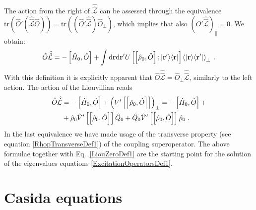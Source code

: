 \documentclass[reprint,aps,prb]{revtex4-1}
\newcommand{\dd}{{\rm d}}
\renewcommand{\r}{{\bf r}}
\newcommand{\be}{\begin{equation}}
\newcommand{\ee}{\end{equation}}
\newcommand{\nn}{\notag}
\newcommand{\lb}{\label}
\newcommand{\op}[1]{\hat {#1}}
\newcommand{\sop}[1]{\op{\op {#1}}}
\newcommand{\commutator}[2]{\left[ {#1} , {#2} \right]}
\newcommand{\trace}[1]{\mathrm{tr}\left(#1\right)}
\newcommand{\ketbra}[2]{| #1 \rangle \langle #2 |}
\newcommand{\dmnot}{\op{\rho}_0}
\newcommand{\hnot}{\op{H}_0}
\newcommand{\Liouv}{\sop{\mathcal L}}
\begin{document}
The action from the right of $\Liouv$ can be assessed through the equivalence $\trace{\op O'(\Liouv\op O)} = \trace{(\op O'\Liouv)\op O_\perp}$, which implies that also
$\left(\op O' \Liouv\right)_\parallel =0$. We obtain:
\be
\op O\Liouv = -\commutator{\hnot}{\op O} + \int \dd\r\dd\r'
U\left[\commutator{\dmnot}{\op O};\ketbra{\r'}{\r}\right]\left(\ketbra{\r}{\r'}\right)_\perp \;. \nn
\ee
With this definition it is explicitly apparent that $\op O\Liouv=\op O_\perp \Liouv$,
similarly to the left action. The action of the Liouvillian reads
\begin{align}\lb{LiouvillianRightActionDef1}
\op O\Liouv &= -\commutator{\hnot}{\op O} + \left(V'\left[\commutator{{\dmnot}}{\op O}\right]\right)_\perp = -\commutator{\hnot}{\op O} + \nn \\ 
&+ \dmnot\op V'\left[\commutator{{\dmnot}}{\op O}\right]\op Q_0 + \op Q_0\op V'\left[\commutator{\dmnot}{\op O}\right]\dmnot \;.
\end{align}
In the last equivalence we have made usage of the transverse property (see equation \eqref{RhopTransverseDef1}) of the coupling superoperator. The above formulae
together with Eq.~\eqref{LiouZeroDef1} are the starting point for the solution of the eigenvalues equations \eqref{ExcitationOperatorsDef1}. 

\section{Casida equations}
\label{casida}
\end{document}
